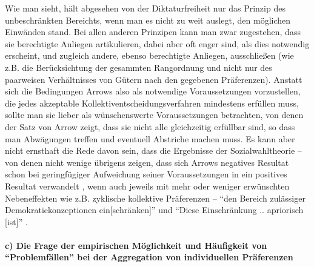Wie man sieht, hält abgesehen von der Diktaturfreiheit nur das Prinzip des
unbeschränkten Bereichts, wenn man es nicht zu weit auslegt, den möglichen
Einwänden stand. Bei allen anderen Prinzipen kann man zwar zugestehen, dass sie
berechtigte Anliegen artikulieren, dabei aber oft enger sind, als dies
notwendig erscheint, und zugleich andere, ebenso berechtigte Anliegen,
ausschließen (wie z.B. die Berücksichtung der gesammten Rangordnung und nicht
nur des paarweisen Verhältnisses von Gütern nach den gegebenen Präferenzen). 
Anstatt sich die Bedingungen Arrows also als notwendige Voraussetzungen
vorzustellen, die jedes akzeptable Kollektiventscheidungsverfahren mindestens
erfüllen muss, sollte man sie lieber als wünschenswerte Voraussetzungen
betrachten, von denen der Satz von Arrow zeigt, dass sie nicht alle
gleichzeitig erfüllbar sind, so dass man Abwägungen treffen und eventuell
Abstriche machen muss. Es kann aber nicht ernsthaft die Rede davon sein, dass
die Ergebnisse der Sozialwahltheorie -- von denen nicht wenige übrigens
zeigen, dass sich Arrows negatives Resultat schon bei geringfügiger Aufweichung
seiner Voraussetzungen in ein positives Resultat verwandelt
\cite[S. 585ff.]{mueller:2003}, wenn auch jeweils mit mehr oder weniger
erwünschten Nebeneffekten wie z.B. zyklische kollektive Präferenzen -- "`den
Bereich zulässiger Demokratiekonzeptionen ein[schränken]"' und "`Diese
Einschränkung .. apriorisch [ist]"' \cite[S. 185]{nida-ruemelin:1991}.

\paragraph{c) Die Frage der empirischen Möglichkeit und Häufigkeit von
"`Problemfällen"' bei der Aggregation von individuellen Präferenzen}


